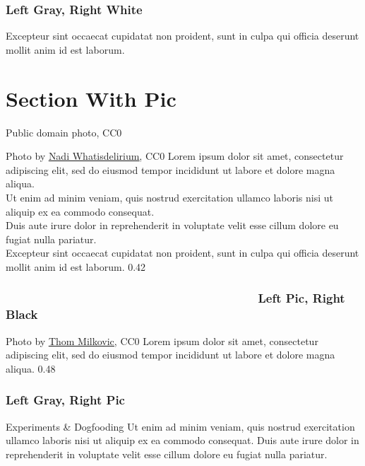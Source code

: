 \documentclass[aspectratio=169,11pt,hyperref={colorlinks=true}]{beamer}
\begin{document}
\begin{lgrayrwhiteframe}
  \frametitle{Left Gray, Right White}
  Excepteur sint occaecat cupidatat non proident, sunt in culpa qui officia deserunt mollit anim id est laborum.
\end{lgrayrwhiteframe}

\section[Section With Pic]{Section With Pic}
\begin{sectionwithpic}{Public domain photo, CC0}
\end{sectionwithpic}

\begin{lpicrblack}{%
  Photo by \href{https://unsplash.com/@whatisdelirium}{\underline{Nadi Whatisdelirium}}, CC0
  }%
  {%
  Lorem ipsum dolor sit amet, consectetur adipiscing elit, sed do eiusmod tempor incididunt ut labore et dolore magna aliqua. \\
  Ut enim ad minim veniam, quis nostrud exercitation ullamco laboris nisi ut aliquip ex ea commodo consequat. \\
  Duis aute irure dolor in reprehenderit in voluptate velit esse cillum dolore eu fugiat nulla pariatur. \\
  Excepteur sint occaecat cupidatat non proident, sunt in culpa qui officia deserunt mollit anim id est laborum.
  }%
  {0.42}%
  \frametitle{~~~~~~~~~~~~~~~~~~~~~~~~~~~~~~~~~~~~~~Left Pic, Right Black}
\end{lpicrblack}

\begin{lgrayframerpic}{%
  Photo by \href{https://unsplash.com/@thommilkovic}{\underline{Thom Milkovic}}, CC0
  }%
  {%
  Lorem ipsum dolor sit amet, consectetur adipiscing elit, sed do eiusmod tempor incididunt ut labore et dolore magna aliqua.
  }%
  {0.48}
  \frametitle{Left Gray, Right Pic}
\end{lgrayframerpic}

\begin{2columnsframe}{Experiments \& Dogfooding}%
  {%
  Ut enim ad minim veniam, quis nostrud exercitation ullamco laboris nisi ut aliquip ex ea commodo consequat.
  }{%
  Duis aute irure dolor in reprehenderit in voluptate velit esse cillum dolore eu fugiat nulla pariatur.
  }
\end{2columnsframe}
\end{document}
